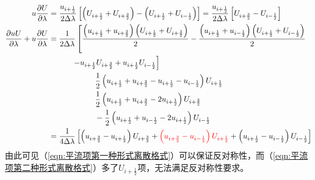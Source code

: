 \documentclass{ctexart}
\begin{document}
\begin{appendix}
\begin{align}
  u \frac{\partial U}{\partial \lambda} & = \frac{u_{i+\frac{1}{2}}}{2 \Delta{\lambda}} \left[ \left( U_{i+\frac{1}{2}} + U_{i+\frac{3}{2}} \right) - \left( U_{i+\frac{1}{2}} + U_{i-\frac{1}{2}} \right) \right] = \frac{u_{i+\frac{1}{2}}}{2 \Delta{\lambda}} \left[ U_{i+\frac{3}{2}} - U_{i-\frac{1}{2}} \right] \nonumber \\
  \frac{\partial u U}{\partial \lambda} + u \frac{\partial U}{\partial \lambda} & = \frac{1}{2 \Delta{\lambda}} \left[ \frac{\left( u_{i+\frac{1}{2}} + u_{i+\frac{3}{2}} \right) \left( U_{i+\frac{1}{2}} + U_{i+\frac{3}{2}} \right)}{2} - \frac{\left( u_{i+\frac{1}{2}} + u_{i-\frac{1}{2}} \right) \left( U_{i+\frac{1}{2}} + U_{i-\frac{1}{2}} \right)}{2} \right. \nonumber \\
  & \quad\quad\quad \left. - u_{i+\frac{1}{2}} U_{i+\frac{3}{2}} + u_{i+\frac{1}{2}} U_{i-\frac{1}{2}} \right] \nonumber \\
  & \quad\quad\quad\quad\quad\quad  \frac{1}{2} \left( u_{i+\frac{1}{2}} + u_{i+\frac{3}{2}} - u_{i+\frac{1}{2}} - u_{i-\frac{1}{2}} \right) U_{i+\frac{1}{2}} \nonumber \\{}
  & \quad\quad\quad\quad\quad\quad  \frac{1}{2} \left( u_{i+\frac{1}{2}} + u_{i+\frac{3}{2}} - 2 u_{i+\frac{1}{2}} \right) U_{i+\frac{3}{2}} \nonumber \\
  & \quad\quad\quad\quad\quad\quad  - \frac{1}{2} \left( u_{i+\frac{1}{2}} + u_{i-\frac{1}{2}} - 2 u_{i+\frac{1}{2}} \right) U_{i-\frac{1}{2}} \nonumber \\
  & = \frac{1}{4 \Delta{\lambda}} \left[ \left( u_{i+\frac{3}{2}} - u_{i+\frac{1}{2}} \right) U_{i+\frac{3}{2}} + {\color{red}\left( u_{i+\frac{3}{2}} - u_{i-\frac{1}{2}} \right) U_{i+\frac{1}{2}}} + \left( u_{i+\frac{1}{2}} - u_{i-\frac{1}{2}} \right) U_{i-\frac{1}{2}} \right] \label{eqn:平流项第二种形式离散格式}
\end{align}
由此可见（\ref{eqn:平流项第一种形式离散格式}）可以保证反对称性，而（\ref{eqn:平流项第二种形式离散格式}）多了$U_{i+\frac{1}{2}}$项，无法满足反对称性要求。

\end{appendix}
\end{document}
